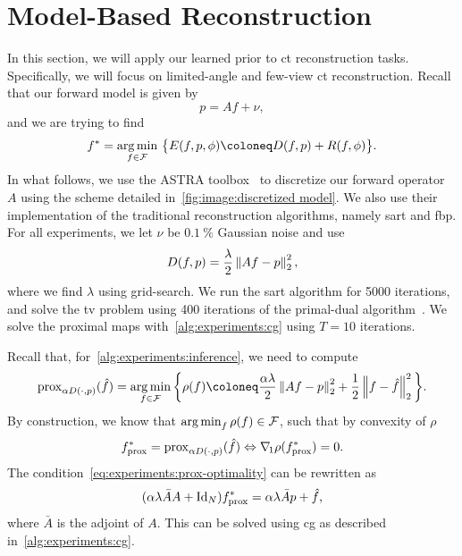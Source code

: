 \documentclass[../ml-ct.tex]{subfiles}
\begin{document}
\section{Model-Based Reconstruction}
In this section, we will apply our learned prior to \gls{ct} reconstruction tasks.
Specifically, we will focus on limited-angle and few-view \gls{ct} reconstruction.
Recall that our forward model is given by
\begin{equation}
	p = Af + \nu,%
\end{equation}
and we are trying to find 
\begin{equation}
	\optimal{f}{} = \argmin_{f \in \set{F}}\ \bigl\{ E(f, p, \params) \coloneq D(f, p) + R(f, \params) \bigr\}.
\end{equation}
In what follows, we use the ASTRA toolbox~\cite{vanaarle_astra_2016,vanaarle_astra_2015} to discretize our forward operator \( A \) using the scheme detailed in~\cref{fig:image:discretized model}.
We also use their implementation of the traditional reconstruction algorithms, namely \gls{sart} and \gls{fbp}.
For all experiments, we let \( \nu \) be \( \SI{0.1}{\percent} \) Gaussian noise and use 
\begin{equation}
	D(f, p) = \frac{\lambda}{2} \left\lVert Af - p\right\rVert_2^2,
\end{equation}
where we find \( \lambda \) using grid-search.
We run the \gls{sart} algorithm for \num{5000} iterations, and solve the \gls{tv} problem using \num{400} iterations of the primal-dual algorithm~\cite{chambolle_primal_2010}.
We solve the proximal maps with~\cref{alg:experiments:cg} using \( T = 10 \) iterations.

Recall that, for~\cref{alg:experiments:inference}, we need to compute
\begin{equation}
	\operatorname{prox}_{\alpha D(\cdot, p)} (\hat{f}) = \argmin_{f\in\set{F}} \bigg\{ \rho(f) \coloneq \frac{\alpha\lambda}{2} \norm{Af - p}_2^2 + \frac{1}{2} \norm{f - \hat{f}}_2^2 \bigg\}.
\end{equation}
By construction, we know that \( \operatorname*{arg\,min}_f \rho(f) \in \mathcal{F} \), such that by convexity of \( \rho \)
\begin{equation}
	\optimal{f}{prox} = \operatorname{prox}_{\alpha D(\cdot, p)} (\hat{f}) \Leftrightarrow \grad{1}\rho(\optimal{f}{prox}) = 0.%
	\label{eq:experiments:prox-optimality}
\end{equation}
The condition~\cref{eq:experiments:prox-optimality} can be rewritten as
\begin{equation}
	(\alpha\lambda \bar{A}A+\mathrm{Id}_{N})f^*_{\text{prox}} = \alpha\lambda \bar{A} p + \hat{f},
\end{equation}
where \( \bar{A} \) is the adjoint of \( A \).
This can be solved using \gls{cg} as described in~\cref{alg:experiments:cg}.
\end{document}
